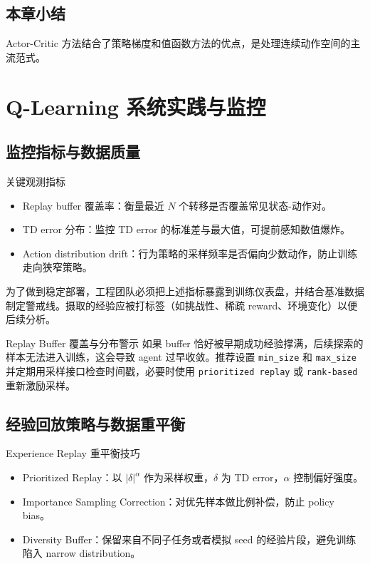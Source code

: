 \documentclass[a4paper]{article}
\begin{document}
\subsection{本章小结}

Actor-Critic 方法结合了策略梯度和值函数方法的优点，是处理连续动作空间的主流范式。

\section{Q-Learning 系统实践与监控}

\subsection{监控指标与数据质量}

\begin{knowledgebox}{关键观测指标}
\begin{itemize}
    \item Replay buffer 覆盖率：衡量最近 $N$ 个转移是否覆盖常见状态-动作对。
    \item TD error 分布：监控 TD error 的标准差与最大值，可提前感知数值爆炸。
    \item Action distribution drift：行为策略的采样频率是否偏向少数动作，防止训练走向狭窄策略。
\end{itemize}
\end{knowledgebox}

为了做到稳定部署，工程团队必须把上述指标暴露到训练仪表盘，并结合基准数据制定警戒线。摄取的经验应被打标签（如挑战性、稀疏 reward、环境变化）以便后续分析。

\begin{importantbox}{Replay Buffer 覆盖与分布警示}
如果 buffer 恰好被早期成功经验撑满，后续探索的样本无法进入训练，这会导致 agent 过早收敛。推荐设置 \texttt{min\_size} 和 \texttt{max\_size} 并定期用采样接口检查时间戳，必要时使用 \texttt{prioritized replay} 或 \texttt{rank-based} 重新激励采样。
\end{importantbox}

\subsection{经验回放策略与数据重平衡}

\begin{knowledgebox}{Experience Replay 重平衡技巧}
\begin{itemize}
    \item Prioritized Replay：以 $|\delta|^\alpha$ 作为采样权重，$\delta$ 为 TD error，$\alpha$ 控制偏好强度。
    \item Importance Sampling Correction：对优先样本做比例补偿，防止 policy bias。
    \item Diversity Buffer：保留来自不同子任务或者模拟 seed 的经验片段，避免训练陷入 narrow distribution。
\end{itemize}
\end{knowledgebox}
\end{document}
